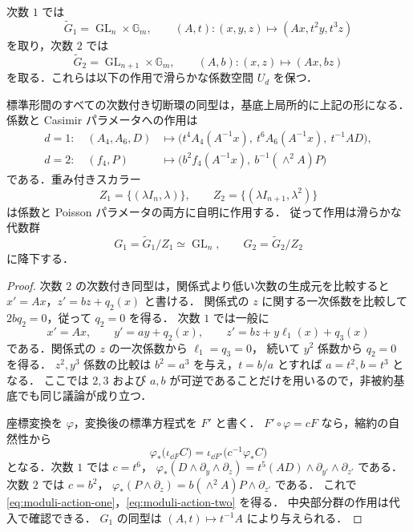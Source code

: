 次数 $1$ では
\[
 \widetilde G_1=\operatorname{GL}_n\times\mathbb G_m,
 \qquad
 (A,t):(x,y,z)\longmapsto(Ax,t^2y,t^3z)
\]
を取り，次数 $2$ では
\[
 \widetilde G_2=\operatorname{GL}_{n+1}\times\mathbb G_m,
 \qquad
 (A,b):(x,z)\longmapsto(Ax,bz)
\]
を取る．これらは以下の作用で滑らかな係数空間 $U_d$ を保つ．

\begin{proposition}
\label{prop:coordinate-action}
標準形間のすべての次数付き切断環の同型は，基底上局所的に上記の形になる．
係数と Casimir パラメータへの作用は
\begin{align}
 d=1:\quad
 (A_4,A_6,D)&\longmapsto
 \bigl(t^4 A_4(A^{-1}x),\ t^6 A_6(A^{-1}x),\ t^{-1}AD\bigr),
 \label{eq:moduli-action-one}\\
 d=2:\quad
 (f_4,P)&\longmapsto
 \bigl(b^2f_4(A^{-1}x),\ b^{-1}(\wedge^2A)P\bigr)
 \label{eq:moduli-action-two}
\end{align}
である．重み付きスカラー
\[
 Z_1=\{(\lambda I_n,\lambda)\},\qquad
 Z_2=\{(\lambda I_{n+1},\lambda^2)\}
\]
は係数と Poisson パラメータの両方に自明に作用する．
従って作用は滑らかな代数群
\begin{equation}
 G_1=\widetilde G_1/Z_1\simeq\operatorname{GL}_n,
 \qquad
 G_2=\widetilde G_2/Z_2
 \label{eq:moduli-groups}
\end{equation}
に降下する．
\end{proposition}

\begin{proof}
次数 $2$ の次数付き同型は，関係式より低い次数の生成元を比較すると
$x'=Ax$，$z'=bz+q_2(x)$ と書ける．
関係式の $z$ に関する一次係数を比較して $2bq_2=0$，従って $q_2=0$ を得る．
次数 $1$ では一般に
\[
 x'=Ax,\qquad y'=ay+q_2(x),\qquad
 z'=bz+y\ell_1(x)+q_3(x)
\]
である．関係式の $z$ の一次係数から $\ell_1=q_3=0$，
続いて $y^2$ 係数から $q_2=0$ を得る．
$z^2,y^3$ 係数の比較は $b^2=a^3$ を与え，$t=b/a$ とすれば $a=t^2,b=t^3$ となる．
ここでは $2,3$ および $a,b$ が可逆であることだけを用いるので，非被約基底でも同じ議論が成り立つ．

座標変換を $\varphi$，変換後の標準方程式を $F'$ と書く．
$F'\circ\varphi=cF$ なら，縮約の自然性から
\begin{equation}
 \varphi_*\bigl(\iota_{\dd F}C\bigr)
 =\iota_{\dd F'}\bigl(c^{-1}\varphi_*C\bigr)
 \label{eq:equation-line-covariance}
\end{equation}
となる．次数 $1$ では $c=t^6$，
$\varphi_*(D\wedge\partial_y\wedge\partial_z)
=t^5(AD)\wedge\partial_{y'}\wedge\partial_{z'}$ である．
次数 $2$ では $c=b^2$，
$\varphi_*(P\wedge\partial_z)=b(\wedge^2A)P\wedge\partial_{z'}$ である．
これで \eqref{eq:moduli-action-one}，\eqref{eq:moduli-action-two} を得る．
中央部分群の作用は代入で確認できる．
$G_1$ の同型は $(A,t)\mapsto t^{-1}A$ により与えられる．
\end{proof}


